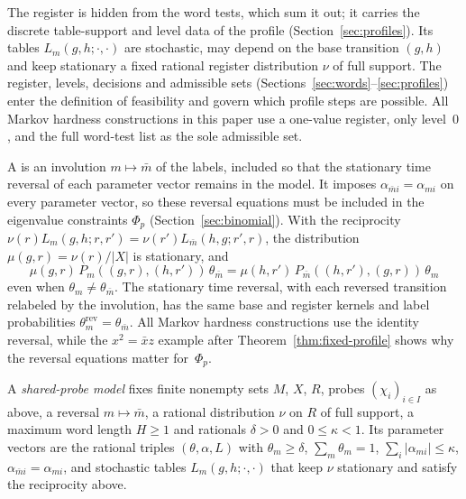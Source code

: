 The register is hidden from the word tests, which sum it out; it carries
the discrete table-support and level data of the profile
(Section~\ref{sec:profiles}). Its tables $L_m(g,h;\cdot,\cdot)$ are
stochastic, may depend on the base transition $(g,h)$ and keep stationary a
fixed rational register distribution $\nu$ of full support. The register,
levels, decisions and admissible sets
(Sections~\ref{sec:words}--\ref{sec:profiles}) enter the definition of
feasibility and govern which profile steps are possible. All Markov
hardness constructions in this paper use a one-value register, only
level~$0$, and the full word-test list as the sole admissible set.

A  is an involution $m\mapsto\bar m$ of the labels,
included so that the stationary time reversal of each parameter vector
remains in the model. It imposes $\alpha_{\bar mi}=\alpha_{mi}$ on every
parameter vector, so these reversal equations must be included in the
eigenvalue constraints $\Phi_p$ (Section~\ref{sec:binomial}). With the
reciprocity $\nu(r)L_m(g,h;r,r')=\nu(r')L_{\bar m}(h,g;r',r)$, the
distribution $\mu(g,r)=\nu(r)/|X|$ is stationary, and
\[
  \mu(g,r)\,P_m((g,r),(h,r'))\,\theta_{\bar m}
  =\mu(h,r')\,P_{\bar m}((h,r'),(g,r))\,\theta_m
\]
even when $\theta_m\neq\theta_{\bar m}$. The stationary time reversal, with
each reversed transition relabeled by the involution, has the same base and
register kernels and label probabilities
$\theta^{\mathrm{rev}}_m=\theta_{\bar m}$. All Markov hardness constructions
use the identity reversal, while the $x^2=\bar xz$ example after
Theorem~\ref{thm:fixed-profile} shows why the reversal equations matter
for~$\Phi_p$.

\begin{definition}\label{def:model}
A \emph{shared-probe model} fixes finite nonempty sets $M$, $X$, $R$,
probes $(\chi_i)_{i\in I}$ as above, a reversal $m\mapsto\bar m$, a rational
distribution $\nu$ on $R$ of full support, a maximum word length $H\ge1$
and rationals $\delta>0$ and $0\le\kappa<1$. Its parameter vectors are the
rational triples $(\theta,\alpha,L)$ with $\theta_m\ge\delta$,
$\sum_m\theta_m=1$, $\sum_i|\alpha_{mi}|\le\kappa$,
$\alpha_{\bar mi}=\alpha_{mi}$, and stochastic tables
$L_m(g,h;\cdot,\cdot)$ that keep $\nu$ stationary and satisfy the
reciprocity above.
\end{definition}

